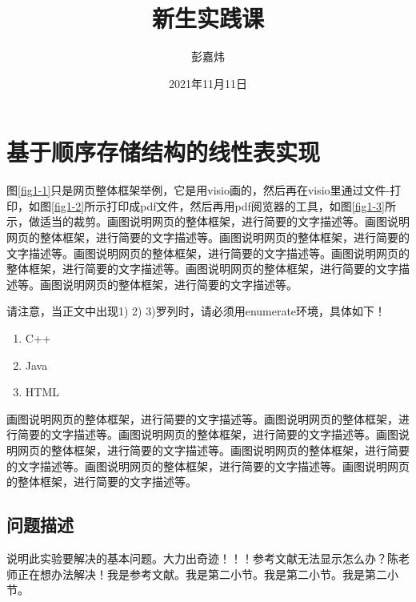 \documentclass[supercite]{Experimental_Report}
\title{~~~~~~新生实践课~~~~~~}
\author{彭嘉炜}
\date{2021年11月11日}
\theoremstyle{definition}
\begin{document}
\maketitle

\clearpage


\tableofcontents[level=2]

\clearpage


\section{基于顺序存储结构的线性表实现}

图\ref{fig1-1}只是网页整体框架举例，它是用visio画的，然后再在visio里通过文件-打印，如图\ref{fig1-2}所示打印成pdf文件，然后再用pdf阅览器的工具，如图\ref{fig1-3}所示，做适当的裁剪。画图说明网页的整体框架，进行简要的文字描述等。画图说明网页的整体框架，进行简要的文字描述等。画图说明网页的整体框架，进行简要的文字描述等。画图说明网页的整体框架，进行简要的文字描述等。画图说明网页的整体框架，进行简要的文字描述等。画图说明网页的整体框架，进行简要的文字描述等。画图说明网页的整体框架，进行简要的文字描述等。

请注意，当正文中出现1) 2) 3)罗列时，请必须用enumerate环境，具体如下！

\begin{enumerate}
\renewcommand{\labelenumi}{\theenumi)}
	\item C++
	\item Java
	\item HTML
\end{enumerate}

画图说明网页的整体框架，进行简要的文字描述等。画图说明网页的整体框架，进行简要的文字描述等。画图说明网页的整体框架，进行简要的文字描述等。画图说明网页的整体框架，进行简要的文字描述等。画图说明网页的整体框架，进行简要的文字描述等。画图说明网页的整体框架，进行简要的文字描述等。画图说明网页的整体框架，进行简要的文字描述等。

\subsection{问题描述}

说明此实验要解决的基本问题。大力出奇迹！！！参考文献无法显示怎么办？陈老师正在想办法解决\cite{STR2021Neurocom, AVS2021Neurocom}！我是参考文献。我是第二小节\cite{Mehrabian1974An}。我是第二小节\cite{Rezaei2014CVPR}。我是第二小节\cite{Ramnath2008IJCV}。
\end{document}
